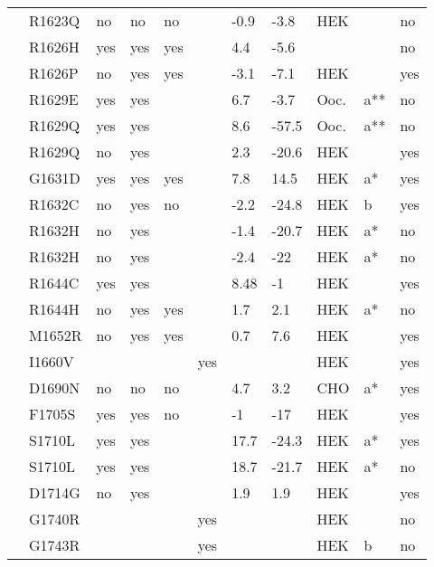 \begin{tiny}
\begin{longtable}{p{4cm}|l|llll|ll|lll}
\citet{Tsurugi2009MutationDB} & R1623Q & no & no & no &  & -0.9 & -3.8 & HEK &  & no \\
\citet{Olesen2012MutationDB} & R1626H & yes & yes & yes &  & 4.4 & -5.6 &  &  & no \\
\citet{Ruan2007MutationDB} & R1626P & no & yes & yes &  & -3.1 & -7.1 & HEK &  & yes \\
\citet{Chen1996MutationDB} & R1629E & yes & yes &  &  & 6.7 & -3.7 & Ooc. & a** & no \\
\citet{Chen1996MutationDB} & R1629Q & yes & yes &  &  & 8.6 & -57.5 & Ooc. & a** & no \\
\citet{Zeng2013MutationDB} & R1629Q & no & yes &  &  & 2.3 & -20.6 & HEK &  & yes \\
\citet{Wang2008MutationDB} & G1631D & yes & yes & yes &  & 7.8 & 14.5 & HEK & a* & yes \\
\citet{Nakajima2015MutationDB} & R1632C & no & yes & no &  & -2.2 & -24.8 & HEK & b & yes \\
\citet{Gui2010aMutationDB} & R1632H & no & yes &  &  & -1.4 & -20.7 & HEK & a* & no \\
\citet{Gui2010bMutationDB} & R1632H & no & yes &  &  & -2.4 & -22 & HEK & a* & no \\
\citet{Frustaci2005MutationDB} & R1644C & yes & yes &  &  & 8.48 & -1 & HEK &  & yes \\
\citet{Wang1996MutationDB} & R1644H & no & yes & yes &  & 1.7 & 2.1 & HEK & a* & no \\
\citet{Ruan2007MutationDB} & M1652R & no & yes & yes &  & 0.7 & 7.6 & HEK &  & yes \\
\citet{Cordeiro2006MutationDB} & I1660V &  &  &  & yes &  &  & HEK &  & yes \\
\citet{Nunez2013MutationDB} & D1690N & no & no & no &  & 4.7 & 3.2 & CHO & a* & yes \\
\citet{Otagiri2008MutationDB} & F1705S & yes & yes & no &  & -1 & -17 & HEK &  & yes \\
\citet{Akai2000MutationDB} & S1710L & yes & yes &  &  & 17.7 & -24.3 & HEK & a* & yes \\
\citet{Shirai2002MutationDB} & S1710L & yes & yes &  &  & 18.7 & -21.7 & HEK & a* & no \\
\citet{Amin2005MutationDB} & D1714G & no & yes &  &  & 1.9 & 1.9 & HEK &  & yes \\
\citet{Baroudi2004MutationDB} & G1740R &  &  &  & yes &  &  & HEK &  & no \\
\citet{Valdivia2004MutationDB} & G1743R &  &  &  & yes &  &  & HEK & b & no \\

\end{longtable}
\end{tiny}
